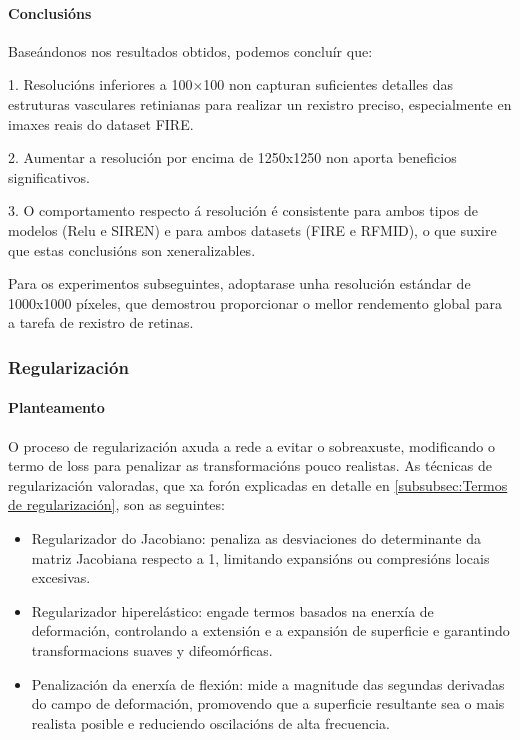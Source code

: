 \paragraph{Conclusións}
\label{par:Conclusions-resolution}

Baseándonos nos resultados obtidos, podemos concluír que:

1. Resolucións inferiores a 100×100 non capturan suficientes detalles das estruturas vasculares retinianas para realizar un rexistro preciso, especialmente en imaxes reais do dataset FIRE.

2. Aumentar a resolución por encima de 1250x1250 non aporta beneficios significativos.

3. O comportamento respecto á resolución é consistente para ambos tipos de modelos (Relu e SIREN) e para ambos datasets (FIRE e RFMID), o que suxire que estas conclusións son xeneralizables.

Para os experimentos subseguintes, adoptarase unha resolución estándar de 1000x1000 píxeles, que demostrou proporcionar o mellor rendemento global para a tarefa de rexistro de retinas.

\subsubsection{Regularización}
\label{subsubsec:Regularización}

\paragraph{Planteamento}
\label{par:Planteamento-regularization}
O proceso de regularización axuda a rede a evitar o sobreaxuste, modificando o termo de loss para penalizar as transformacións pouco realistas.
As técnicas de regularización valoradas, que xa forón explicadas en detalle en \ref{subsubsec:Termos de regularización}, son as seguintes:

\begin{itemize}
    \item Regularizador do Jacobiano: penaliza as desviaciones do determinante da matriz Jacobiana respecto a 1, limitando expansións ou compresións locais excesivas.
    \item Regularizador hiperelástico: engade termos basados na enerxía de deformación, controlando a extensión e a expansión de superficie e garantindo transformacions suaves y difeomórficas.
    \item Penalización da enerxía de flexión: mide a magnitude das segundas derivadas do campo de deformación, promovendo que a superficie resultante sea o mais realista posible e reduciendo oscilacións de alta frecuencia.
\end{itemize}

